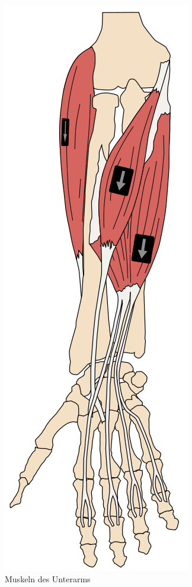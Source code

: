 \documentclass[final,20pt]{beamer}
\newlength{\sepwidth}
\newlength{\colwidth}
\newcommand{\separatorcolumn}{\begin{column}{\sepwidth}\end{column}}
\begin{document}
\begin{frame}[t]
\begin{columns}[t]
\begin{column}{\colwidth}
	\begin{figure}
		\centering \includegraphics[scale=0.4]{unterarm-muskeln.png}
		\caption{\centering Muskeln des Unterarms}
	\end{figure}
\end{column}

\separatorcolumn
\end{columns}
\end{frame}
\end{document}
